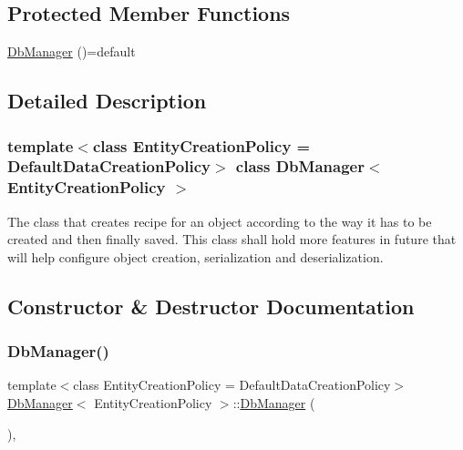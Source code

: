 \subsection*{Protected Member Functions}
\begin{DoxyCompactItemize}
\item 
\mbox{\hyperlink{classDbManager_a303a0e1b940c528144c7a698943d4dae}{Db\+Manager}} ()=default
\end{DoxyCompactItemize}


\subsection{Detailed Description}
\subsubsection*{template$<$class Entity\+Creation\+Policy = Default\+Data\+Creation\+Policy$>$\newline
class Db\+Manager$<$ Entity\+Creation\+Policy $>$}

The class that creates recipe for an object according to the way it has to be created and then finally saved. This class shall hold more features in future that will help configure object creation, serialization and deserialization. 

\subsection{Constructor \& Destructor Documentation}
\mbox{\label{classDbManager_a303a0e1b940c528144c7a698943d4dae}} 
\subsubsection{\texorpdfstring{Db\+Manager()}{DbManager()}}
{\footnotesize\ttfamily template$<$class Entity\+Creation\+Policy  = Default\+Data\+Creation\+Policy$>$ \\
\mbox{\hyperlink{classDbManager}{Db\+Manager}}$<$ Entity\+Creation\+Policy $>$\+::\mbox{\hyperlink{classDbManager}{Db\+Manager}} (\begin{DoxyParamCaption}{ }\end{DoxyParamCaption})\hspace{0.3cm}{\ttfamily [protected]}, {\ttfamily [default]}}



